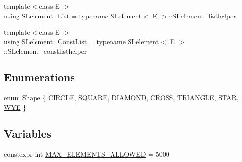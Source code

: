 \begin{DoxyCompactItemize}
\item 
{\footnotesize template$<$class E $>$ }\\using \hyperlink{namespacebridges_1_1datastructure_a0db8f181ce44ed3dd8b3da7184c2364a}{S\+Lelement\+\_\+\+List} = typename \hyperlink{classbridges_1_1datastructure_1_1_s_lelement}{S\+Lelement}$<$ E $>$\+::S\+Lelement\+\_\+listhelper
\item 
{\footnotesize template$<$class E $>$ }\\using \hyperlink{namespacebridges_1_1datastructure_adc1ea9eeab8d889046a192dc16743190}{S\+Lelement\+\_\+\+Const\+List} = typename \hyperlink{classbridges_1_1datastructure_1_1_s_lelement}{S\+Lelement}$<$ E $>$\+::S\+Lelement\+\_\+constlisthelper
\end{DoxyCompactItemize}
\subsection*{Enumerations}
\begin{DoxyCompactItemize}
\item 
enum \hyperlink{namespacebridges_1_1datastructure_a3408f5f44d9c6062e5f3adb7e1bbb7f0}{Shape} \{ \newline
\hyperlink{namespacebridges_1_1datastructure_a3408f5f44d9c6062e5f3adb7e1bbb7f0a18ad7c088ebdda05673a1a586eede99a}{C\+I\+R\+C\+LE}, 
\hyperlink{namespacebridges_1_1datastructure_a3408f5f44d9c6062e5f3adb7e1bbb7f0a63cd254f1ceccbe871f60e3b7f0666d5}{S\+Q\+U\+A\+RE}, 
\hyperlink{namespacebridges_1_1datastructure_a3408f5f44d9c6062e5f3adb7e1bbb7f0a170d2d8b57d448ed19e563ee3cd28b35}{D\+I\+A\+M\+O\+ND}, 
\hyperlink{namespacebridges_1_1datastructure_a3408f5f44d9c6062e5f3adb7e1bbb7f0ab6afc15f9badffaf05a23b3f1ba1081a}{C\+R\+O\+SS}, 
\newline
\hyperlink{namespacebridges_1_1datastructure_a3408f5f44d9c6062e5f3adb7e1bbb7f0ab1bf469052aa5abf241c54f8331b6fc4}{T\+R\+I\+A\+N\+G\+LE}, 
\hyperlink{namespacebridges_1_1datastructure_a3408f5f44d9c6062e5f3adb7e1bbb7f0a995b35f7cf12b5842d94aba9ce5c8b4d}{S\+T\+AR}, 
\hyperlink{namespacebridges_1_1datastructure_a3408f5f44d9c6062e5f3adb7e1bbb7f0aa0494702a25d198f538266dcb8ba52df}{W\+YE}
 \}
\end{DoxyCompactItemize}
\subsection*{Variables}
\begin{DoxyCompactItemize}
\item 
constexpr int \hyperlink{namespacebridges_1_1datastructure_a2e75baaa66b6c9cd3f5c5f598b2c8147}{M\+A\+X\+\_\+\+E\+L\+E\+M\+E\+N\+T\+S\+\_\+\+A\+L\+L\+O\+W\+ED} = 5000
\end{DoxyCompactItemize}



